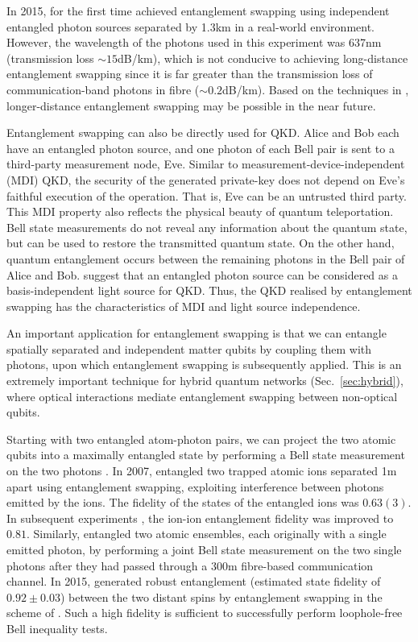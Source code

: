 In 2015, \cite{bib:Nat_526_682} for the first time achieved entanglement swapping using independent entangled photon sources separated by 1.3km in a real-world environment. However, the wavelength of the photons used in this experiment was 637nm (transmission loss \mbox{$\sim 15$dB/km}), which is not conducive to achieving long-distance entanglement swapping since it is far greater than the transmission loss of communication-band photons in fibre (\mbox{$\sim 0.2$dB/km}). Based on the techniques in \cite{bib:sun2016quantum, bib:Nat_phot_10_676}, longer-distance entanglement swapping may be possible in the near future.

Entanglement swapping can also be directly used for QKD. Alice and Bob each have an entangled photon source, and one photon of each Bell pair is sent to a third-party measurement node, Eve. Similar to measurement-device-independent (MDI) QKD, the security of the generated private-key does not depend on Eve's faithful execution of the operation. That is, Eve can be an untrusted third party. This MDI property also reflects the physical beauty of quantum teleportation. Bell state measurements do not reveal any information about the quantum state, but can be used to restore the transmitted quantum state. On the other hand, quantum entanglement occurs between the remaining photons in the Bell pair of Alice and Bob. \cite{bib:PRL_90_057902, bib:NJP_10_2008} suggest that an entangled photon source can be considered as a basis-independent light source for QKD. Thus, the QKD realised by entanglement swapping has the characteristics of MDI and light source independence.

An important application for entanglement swapping is that we can entangle spatially separated and independent matter qubits by coupling them with photons, upon which entanglement swapping is subsequently applied. This is an extremely important technique for hybrid quantum networks (Sec.~\ref{sec:hybrid}), where optical interactions mediate entanglement swapping between non-optical qubits.

Starting with two entangled atom-photon pairs, we can project the two atomic qubits into a maximally entangled state by performing a Bell state measurement on the two photons \cite{bib:blinov2004observation, bib:PRL_96_030404}. In 2007, \cite{bib:Nature_449_68} entangled two trapped atomic ions separated 1m apart using entanglement swapping, exploiting interference between photons emitted by the ions. The fidelity of the states of the entangled ions was $0.63(3)$. In subsequent experiments \cite{bib:PRL_100_150404}, the ion-ion entanglement fidelity was improved to $0.81$. Similarly, \cite{bib:Nature_454_1098} entangled two atomic ensembles, each originally with a single emitted photon, by performing a joint Bell state measurement on the two single photons after they had passed through a 300m fibre-based communication channel. In 2015, \cite{bib:hensen2015loophole} generated robust entanglement (estimated state fidelity of $0.92\pm0.03$) between the two distant spins by entanglement swapping in the scheme of \cite{bib:BarrettKok05, bib:bernien2013heralded}. Such a high fidelity is sufficient to successfully perform loophole-free Bell inequality tests.

